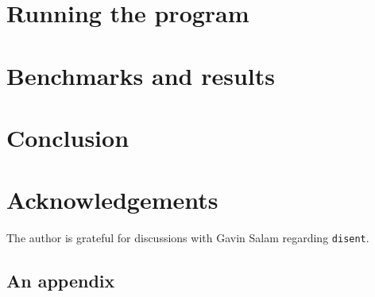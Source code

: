 \documentclass[submission, PhysCodeb]{SciPost}
\begin{document}
\section{Running the program}
\label{sec:running}

\section{Benchmarks and results}
\label{sec:benchmarks}

\section{Conclusion}
\label{sec:conclusion}

\section*{Acknowledgements}
The author is grateful for discussions with Gavin Salam regarding {\tt disent}. 


\begin{appendix}

  \section{An appendix}

\end{appendix}



\nolinenumbers
\end{document}
